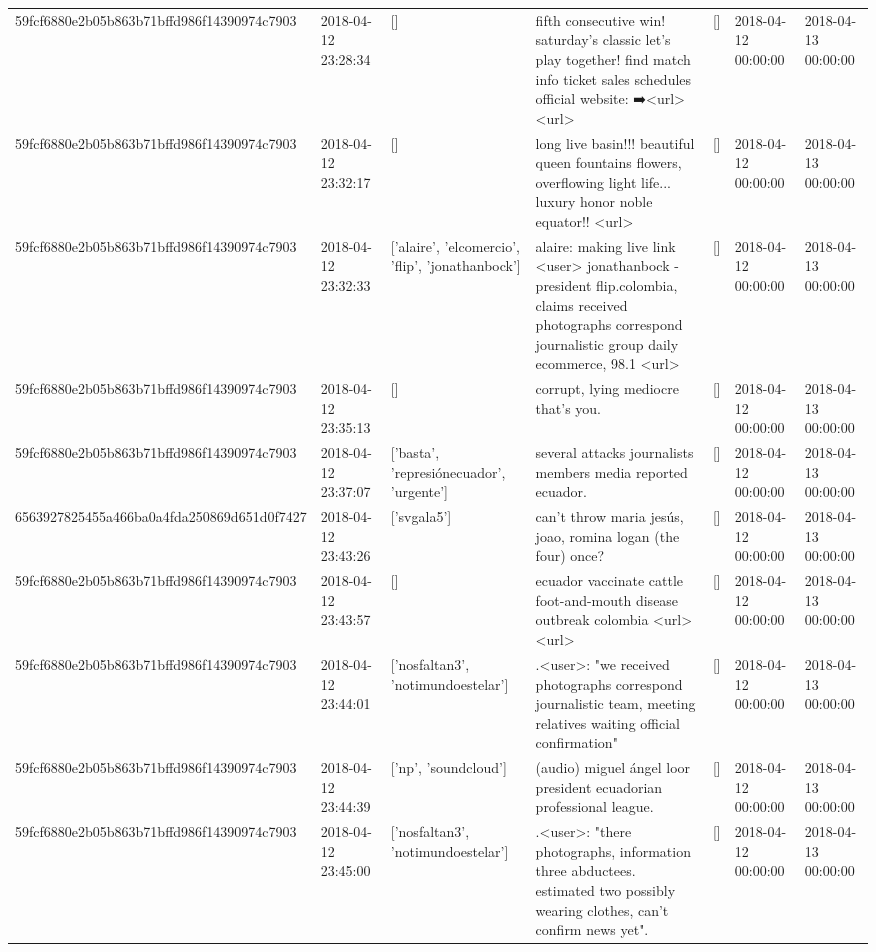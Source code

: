 \begin{tabular}{lllllll}
59fcf6880e2b05b863b71bffd986f14390974c7903 & 2018-04-12 23:28:34 & [] & fifth consecutive win! saturday's classic let's play together! find match info ticket sales schedules official website: ➡️<url> <url> & [] & 2018-04-12 00:00:00 & 2018-04-13 00:00:00 \\
59fcf6880e2b05b863b71bffd986f14390974c7903 & 2018-04-12 23:32:17 & [] & long live basin!!! beautiful queen fountains flowers, overflowing light life... luxury honor noble equator!! <url> & [] & 2018-04-12 00:00:00 & 2018-04-13 00:00:00 \\
59fcf6880e2b05b863b71bffd986f14390974c7903 & 2018-04-12 23:32:33 & ['alaire', 'elcomercio', 'flip', 'jonathanbock'] & alaire: making live link <user> jonathanbock - president flip.colombia, claims received photographs correspond journalistic group daily ecommerce, 98.1 <url> & [] & 2018-04-12 00:00:00 & 2018-04-13 00:00:00 \\
59fcf6880e2b05b863b71bffd986f14390974c7903 & 2018-04-12 23:35:13 & [] & corrupt, lying mediocre that's you. & [] & 2018-04-12 00:00:00 & 2018-04-13 00:00:00 \\
59fcf6880e2b05b863b71bffd986f14390974c7903 & 2018-04-12 23:37:07 & ['basta', 'represiónecuador', 'urgente'] & several attacks journalists members media reported ecuador. & [] & 2018-04-12 00:00:00 & 2018-04-13 00:00:00 \\
6563927825455a466ba0a4fda250869d651d0f7427 & 2018-04-12 23:43:26 & ['svgala5'] & can't throw maria jesús, joao, romina logan (the four) once? & [] & 2018-04-12 00:00:00 & 2018-04-13 00:00:00 \\
59fcf6880e2b05b863b71bffd986f14390974c7903 & 2018-04-12 23:43:57 & [] & ecuador vaccinate cattle foot-and-mouth disease outbreak colombia <url> <url> & [] & 2018-04-12 00:00:00 & 2018-04-13 00:00:00 \\
59fcf6880e2b05b863b71bffd986f14390974c7903 & 2018-04-12 23:44:01 & ['nosfaltan3', 'notimundoestelar'] & .<user>: "we received photographs correspond journalistic team, meeting relatives waiting official confirmation" & [] & 2018-04-12 00:00:00 & 2018-04-13 00:00:00 \\
59fcf6880e2b05b863b71bffd986f14390974c7903 & 2018-04-12 23:44:39 & ['np', 'soundcloud'] & (audio) miguel ángel loor president ecuadorian professional league. & [] & 2018-04-12 00:00:00 & 2018-04-13 00:00:00 \\
59fcf6880e2b05b863b71bffd986f14390974c7903 & 2018-04-12 23:45:00 & ['nosfaltan3', 'notimundoestelar'] & .<user>: "there photographs, information three abductees. estimated two possibly wearing clothes, can't confirm news yet". & [] & 2018-04-12 00:00:00 & 2018-04-13 00:00:00 \\

\end{tabular}

